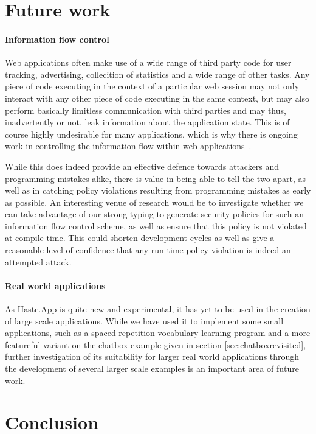 \documentclass[preprint]{sigplanconf}
\begin{document}
\section{Future work}

\paragraph{Information flow control} Web applications often make use of a wide
range of third party code for user tracking, advertising, collecition of
statistics and a wide range of other tasks. Any piece of code executing in the
context of a particular web session may not only interact with any other piece
of code executing in the same context, but may also perform basically limitless
communication with third parties and may thus, inadvertently or not, leak
information about the application state. This is of course highly undesirable
for many applications, which is why there is ongoing work in controlling the
information flow within web applications\ \cite{jsflow}.

While this does indeed provide an effective defence towards attackers and
programming mistakes alike, there is value in being able to tell the two apart,
as well as in catching policy violations resulting from programming mistakes
as early as possible. An interesting venue of research would be to investigate
whether we can take advantage of our strong typing to generate security policies
for such an information flow control scheme, as well as ensure that this policy
is not violated at compile time. This could shorten development cycles as well
as give a reasonable level of confidence that any run time policy violation is
indeed an attempted attack.

\paragraph{Real world applications} As Haste.App is quite new and experimental,
it has yet to be used in the creation of large scale applications. While we
have used it to implement some small applications, such as a spaced repetition
vocabulary learning program and a more featureful variant on the chatbox
example given in section \ref{sec:chatboxrevisited}, further investigation of
its suitability for larger real world applications through the development of
several larger scale examples is an important area of future work.

\section{Conclusion}
\end{document}
